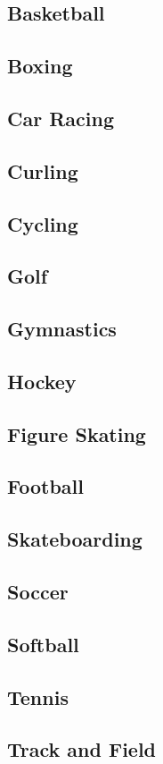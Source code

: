 \documentclass[12pt]{book}
\begin{document}
		\subsection{Basketball}
		\subsection{Boxing}
		\subsection{Car Racing}
		\subsection{Curling}
		\subsection{Cycling}
		\subsection{Golf}
		\subsection{Gymnastics}
		\subsection{Hockey}
		\subsection{Figure Skating}
		\subsection{Football}
		\subsection{Skateboarding}		
		\subsection{Soccer}
		\subsection{Softball}
		\subsection{Tennis}
		\subsection{Track and Field}
\end{document}
